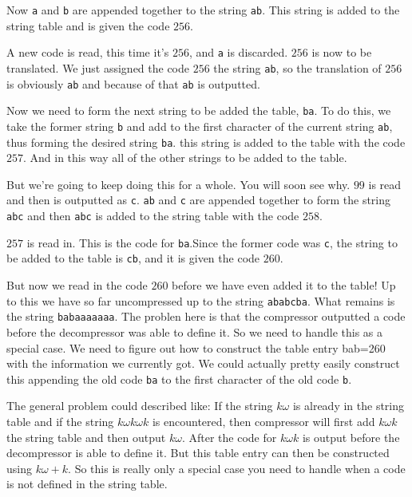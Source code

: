 Now \texttt{a} and \texttt{b} are appended together to the string
\texttt{ab}. This string is added to the string table and is given the
code $256$.

A new code is read, this time it's $256$, and \texttt{a} is
discarded. $256$ is now to be translated. We just assigned the code
$256$ the string \texttt{ab}, so the translation of $256$ is obviously
\texttt{ab} and because of that \texttt{ab} is outputted.

Now we need to form the next string to be added the table,
\texttt{ba}. To do this, we take the former string \texttt{b} and add
to the first character of the current string \texttt{ab}, thus forming
the desired string \texttt{ba}. this string is added to the table with
the code $257$. And in this way all of the other strings to be added
to the table.

But we're going to keep doing this for a whole. You will soon see
why. $99$ is read and then is outputted as \texttt{c}. \texttt{ab} and
\texttt{c} are appended together to form the string \texttt{abc} and then
\texttt{abc} is added to the string table with the code $258$.

$257$ is read in. This is the code for \texttt{ba}.Since the former
code was \texttt{c}, the string to be added to the table is
\texttt{cb}, and it is given the code $260$.

But now we read in the code $260$ before we have even added it to the
table! Up to this we have so far uncompressed up to the string
\texttt{ababcba}. What remains is the string \texttt{babaaaaaaa}. The
problen here is that the compressor outputted a code before the
decompressor was able to define it. So we need to handle this as a
special case. We need to figure out how to construct the table entry
bab=260 with the information we currently got. We could actually
pretty easily construct this appending the old code \texttt{ba} to the
first character of the old code \texttt{b}.

\newcommand{\ko}{\ensuremath{k\omega}\xspace}
\newcommand{\kok}{\ensuremath{\ko k}\xspace}
\newcommand{\kokok}{\ensuremath{\kok \omega k}\xspace}

The general problem could described like: If the string \ko is already
in the string table and if the string \kokok is encountered, then
compressor will first add \kok the string table and then output
\ko. After the code for \kok is output before the decompressor is able
to define it. But this table entry can then be constructed using $\ko
+k$.  So this is really only a special case you need to handle when a
code is not defined in the string table.

